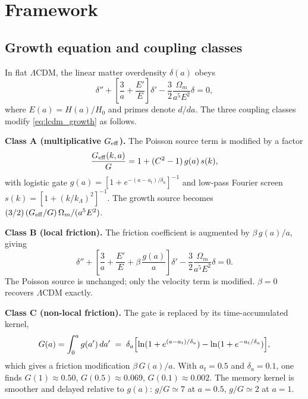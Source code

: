 \documentclass[11pt,a4paper]{article}
\begin{document}
\section{Framework}

\subsection{Growth equation and coupling classes}

In flat $\Lambda$CDM, the linear matter overdensity $\delta(a)$ obeys
\begin{equation}
    \delta'' + \left[\frac{3}{a} + \frac{E'}{E}\right]\delta' - \frac{3}{2}\frac{\Omega_m}{a^5 E^2}\delta = 0,
    \label{eq:lcdm_growth}
\end{equation}
where $E(a) = H(a)/H_0$ and primes denote $d/da$. The three coupling classes modify \eqref{eq:lcdm_growth} as follows.

\textbf{Class A (multiplicative $G_{\rm eff}$).} The Poisson source term is modified by a factor
\begin{equation}
    \frac{G_{\rm eff}(k,a)}{G} = 1 + (C^2-1)\,g(a)\,s(k),
    \label{eq:geff}
\end{equation}
with logistic gate $g(a) = [1 + e^{-(a-a_t)/\delta_a}]^{-1}$ and low-pass Fourier screen $s(k) = [1 + (k/k_\Lambda)^2]^{-1}$. The growth source becomes $(3/2)\,(G_{\rm eff}/G)\,\Omega_m/(a^5 E^2)$.

\textbf{Class B (local friction).} The friction coefficient is augmented by $\beta\, g(a)/a$, giving
\begin{equation}
    \delta'' + \left[\frac{3}{a} + \frac{E'}{E} + \beta\,\frac{g(a)}{a}\right]\delta' - \frac{3}{2}\frac{\Omega_m}{a^5 E^2}\delta = 0.
    \label{eq:variantJ}
\end{equation}
The Poisson source is unchanged; only the velocity term is modified. $\beta = 0$ recovers $\Lambda$CDM exactly.

\textbf{Class C (non-local friction).} The gate is replaced by its time-accumulated kernel,
\begin{equation}
    G(a) = \int_0^a g(a')\,da' \;=\; \delta_a\Bigl[\ln(1 + e^{(a-a_t)/\delta_a}) - \ln(1 + e^{-a_t/\delta_a})\Bigr],
    \label{eq:Ga_analytic}
\end{equation}
which gives a friction modification $\beta\, G(a)/a$. With $a_t = 0.5$ and $\delta_a = 0.1$, one finds $G(1) \approx 0.50$, $G(0.5) \approx 0.069$, $G(0.1) \approx 0.002$. The memory kernel is smoother and delayed relative to $g(a)$: $g/G \simeq 7$ at $a=0.5$, $g/G \simeq 2$ at $a=1$.
\end{document}
